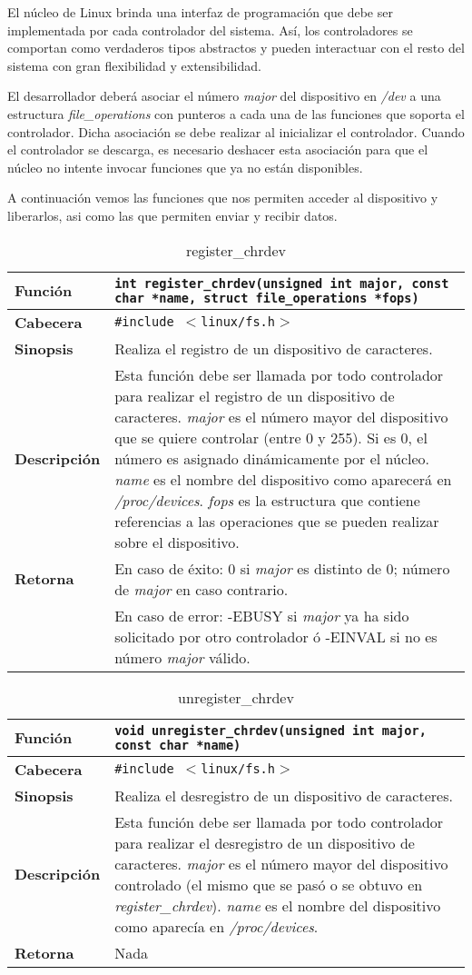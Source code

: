 \documentclass[12pt,a4paper,spanish]{article}
\newenvironment{funcdesc}[1]
	{	
		\begin{table}[!htp]
		\caption{ {#1} }
		\begin{small}
		\begin{tabular}{ | l | p{10cm} | } \hline
	}
	{
		\end{tabular}
		\end{small}
		\end{table}
	}
\newcommand{\funcion}[1] {\textbf {Función} &  \texttt{{#1}} \\ \hline}
\newcommand{\cabecera}[1] {\textbf {Cabecera} &  \texttt{\#include $<${#1}$>$} \\ \hline}
\newcommand{\sinopsis}[1] {\textbf {Sinopsis} &  {#1} \\ \hline}
\newcommand{\descrip}[1] {\textbf {Descripción} &  {#1} \\ \hline}
\newcommand{\return}[2]{ \textbf{Retorna} & En caso de éxito: {#1} \\ & En caso de error: {#2} \\ \hline }
\newcommand{\returnNada}[0]{ \textbf{Retorna} & Nada \\ \hline }
\begin{document}
El núcleo de Linux brinda una interfaz de programación que debe ser implementada por cada controlador del sistema. Así, los controladores se comportan como verdaderos tipos abstractos y pueden interactuar con el resto del sistema con gran flexibilidad y extensibilidad.

El desarrollador deberá asociar el número \textit{major} del dispositivo en \textit{/dev} a una estructura \textit{file\_operations} con punteros a cada una de las funciones que soporta el controlador. Dicha asociación se debe realizar al inicializar el controlador. Cuando el controlador se descarga, es necesario deshacer esta asociación para que el núcleo no intente invocar funciones que ya no están disponibles.

A continuación vemos las funciones que nos permiten acceder al dispositivo y liberarlos, asi como las que permiten enviar y recibir datos.

\begin{funcdesc}{register\_chrdev}
\funcion{int register\_chrdev(unsigned int major, const char *name, struct file\_operations *fops)}
\cabecera{linux/fs.h}
\sinopsis{Realiza el registro de un dispositivo de caracteres.}
\descrip{Esta función debe ser llamada por todo controlador para realizar el registro de un dispositivo de caracteres. \textit{major} es el número mayor del dispositivo que se quiere controlar (entre 0 y 255). Si es 0, el número es asignado dinámicamente por el núcleo. \textit{name} es el nombre del dispositivo como aparecerá en \textit{/proc/devices}. \textit{fops} es la estructura que contiene referencias a las operaciones que se pueden realizar sobre el dispositivo. }
\return{0 si \textit{major} es distinto de 0; número de \textit{major} en caso contrario.}{-EBUSY si \textit{major} ya ha sido solicitado por otro controlador   ó -EINVAL si no es número \textit{major} válido.}
\end{funcdesc} 

\begin{funcdesc}{unregister\_chrdev}
\funcion{void unregister\_chrdev(unsigned int major, const char *name)}
\cabecera{linux/fs.h}
\sinopsis{Realiza el desregistro de un dispositivo de caracteres.}
\descrip{Esta función debe ser llamada por todo controlador para realizar el desregistro de un dispositivo de caracteres. \textit{major} es el número mayor del dispositivo controlado (el mismo que se pasó o se obtuvo en \textit{register\_chrdev}). \textit{name} es el nombre del dispositivo como aparecía en \textit{/proc/devices}.}
\returnNada
\end{funcdesc} 
\end{document}

